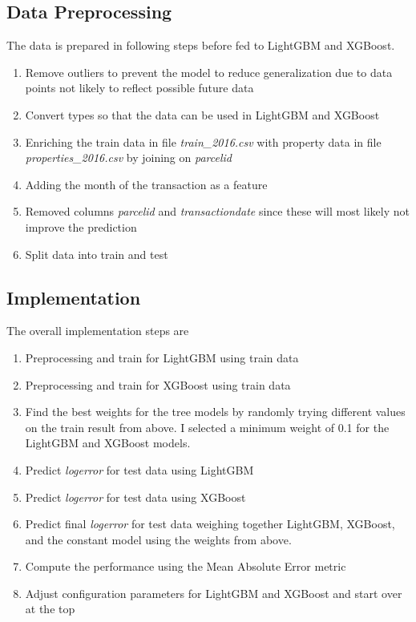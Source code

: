 \documentclass[a4paper]{article}
\begin{document}
\subsection{Data Preprocessing}
The data is prepared in following steps before fed to LightGBM and XGBoost.
\begin{enumerate}
    \item Remove outliers to prevent the model to reduce generalization due to data points not likely to reflect possible future data
    \item Convert types so that the data can be used in LightGBM and XGBoost
    \item Enriching the train data in file \textit{train\_2016.csv} with property data in file
        \textit{properties\_2016.csv} by joining on \textit{parcelid}
    \item Adding the month of the transaction as a feature
    \item Removed columns \textit{parcelid} and \textit{transactiondate} since these will most likely not improve the prediction
    \item Split data into train and test
\end{enumerate}

\subsection{Implementation}
The overall implementation steps are
\begin{enumerate}
    \item Preprocessing and train for LightGBM using train data
    \item Preprocessing and train for XGBoost using train data
    \item Find the best weights for the tree models by randomly trying different values on the train result from above. I selected a minimum weight of 0.1 for the LightGBM and XGBoost models.
    \item Predict \textit{logerror} for test data using LightGBM
    \item Predict \textit{logerror} for test data using XGBoost
    \item Predict final \textit{logerror} for test data weighing together LightGBM, XGBoost, and the constant model using the weights from above.
    \item Compute the performance using the Mean Absolute Error metric
    \item Adjust configuration parameters for LightGBM and XGBoost and start over at the top
\end{enumerate}
\end{document}
